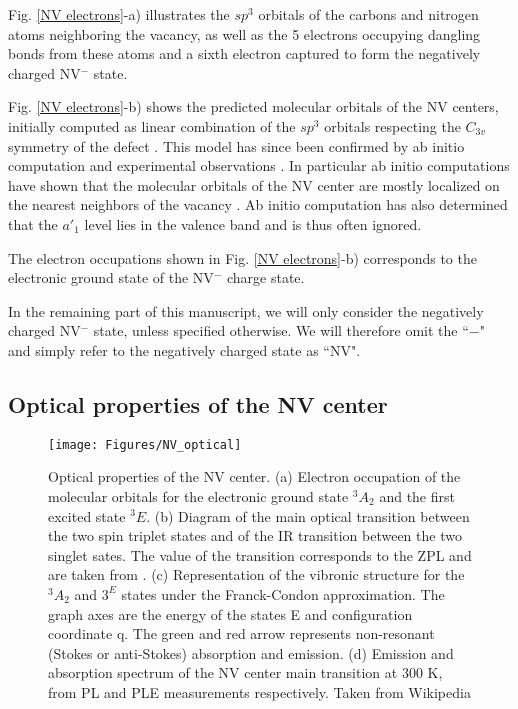 \documentclass[a4paper,11pt]{report}
\begin{document}
Fig. \ref{NV electrons}-a) illustrates the $sp^3$ orbitals of the carbons and nitrogen atoms neighboring the vacancy, as well as the 5 electrons occupying dangling bonds from these atoms and a sixth electron captured to form the negatively charged NV$^-$ state. 

Fig. \ref{NV electrons}-b) shows the predicted molecular orbitals of the NV centers, initially computed as linear combination of the $sp^3$ orbitals respecting the $C_{3v}$ symmetry of the defect \citep{loubser1978electron}. This model has since been confirmed by ab initio computation and experimental observations \citep{doherty2013nitrogen}. In particular ab initio computations have shown that the molecular orbitals of the NV center are mostly localized on the nearest neighbors of the vacancy \citep{gali2008ab}. Ab initio computation has also determined that the $a'_1$ level lies in the valence band and is thus often ignored.

The electron occupations shown in Fig. \ref{NV electrons}-b) corresponds to the electronic ground state of the NV$^-$ charge state.

In the remaining part of this manuscript, we will only consider the negatively charged NV$^-$ state, unless specified otherwise. We will therefore omit the ``$-$" and simply refer to the negatively charged state as ``NV".
\subsection{Optical properties of the NV center}
\begin{figure}[h!]
\centering
\texttt{[image: Figures/NV\_optical]}
\caption{Optical properties of the NV center. (a) Electron occupation of the molecular orbitals for the electronic ground state $^3A_2$ and the first excited state $^3E$. (b) Diagram of the main optical transition between the two spin triplet states and of the IR transition between the two singlet sates. The value of the transition corresponds to the ZPL and are taken from \citep{doherty2013nitrogen}. (c) Representation of the vibronic structure for the $^3A_2$ and $3^E$ states under the Franck-Condon approximation. The graph axes are the energy of the states E and configuration coordinate q. The green and red arrow represents non-resonant (Stokes or anti-Stokes) absorption and emission. (d) Emission and absorption spectrum of the NV center main transition at 300 K, from PL and PLE measurements respectively. Taken from Wikipedia}
\label{NV optical}
\end{figure}
\end{document}
